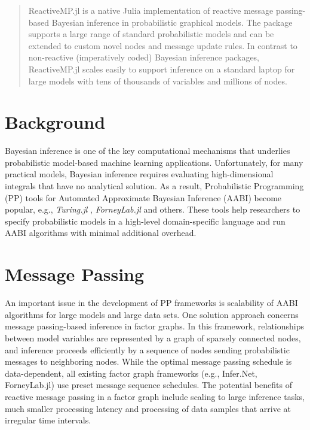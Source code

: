 \documentclass{juliacon}
\begin{document}


\maketitle

\begin{abstract}

ReactiveMP.jl is a native Julia implementation of reactive message passing-based Bayesian inference in probabilistic graphical models. 
The package supports a large range of standard probabilistic models and can be extended to custom novel nodes and message update rules. 
In contrast to non-reactive (imperatively coded) Bayesian inference packages, ReactiveMP.jl scales easily to support inference on a standard laptop 
for large models with tens of thousands of variables and millions of nodes.

\end{abstract}

\section{Background}

Bayesian inference is one of the key computational mechanisms that underlies probabilistic model-based machine learning applications. 
Unfortunately, for many practical models, Bayesian inference requires evaluating high-dimensional integrals that have no analytical solution. 
As a result, Probabilistic Programming (PP) tools for Automated Approximate Bayesian Inference (AABI) become popular, e.g., \textit{Turing.jl} \cite{ge2018t}, 
\textit{ForneyLab.jl} \cite{ForneyLab.jl-2019} and others. These tools help researchers to specify probabilistic models in a high-level domain-specific language and 
run AABI algorithms with minimal additional overhead. 

\section{Message Passing}

An important issue in the development of PP frameworks is scalability of AABI algorithms for large models and large data sets. 
One solution approach concerns message passing-based inference in factor graphs. In this framework, relationships between model variables are represented by a graph of sparsely connected nodes, 
and inference proceeds efficiently by a sequence of nodes sending probabilistic messages to neighboring nodes. While the optimal message passing schedule is data-dependent, 
all existing factor graph frameworks (e.g., Infer.Net, ForneyLab.jl) use preset message sequence schedules. The potential benefits of reactive message passing in a factor graph include 
scaling to large inference tasks, much smaller processing latency and processing of data samples that arrive at irregular time intervals.
\end{document}
